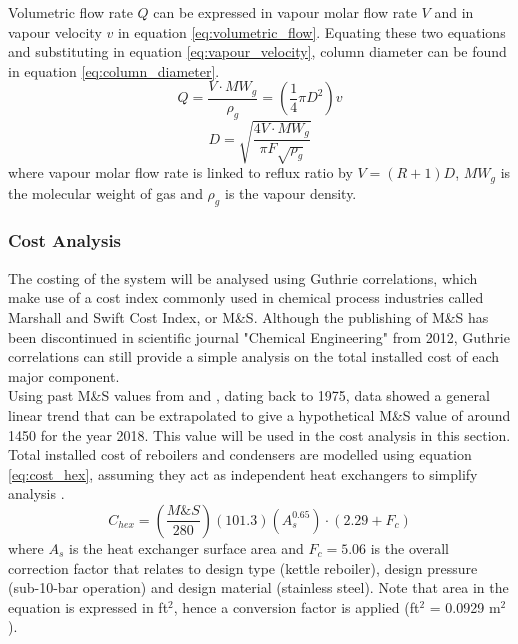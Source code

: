 		\noindent Volumetric flow rate $Q$ can be expressed in vapour molar flow rate $V$ and in vapour velocity $v$ in equation \ref{eq:volumetric_flow}. Equating these two equations and substituting in equation \ref{eq:vapour_velocity}, column diameter can be found in equation \ref{eq:column_diameter}.
		\begin{equation}
		    Q = \frac{V \cdot MW_g}{\rho_g} = \left(\frac{1}{4}\pi D^2\right)v
		    \label{eq:volumetric_flow}
		\end{equation}
		\begin{equation}
		    D = \sqrt{\frac{4V\cdot MW_g}{\pi F \sqrt{\rho_g}}}
		    \label{eq:column_diameter}
		\end{equation}
		where vapour molar flow rate is linked to reflux ratio by $V = (R+1)D$, $MW_g$ is the molecular weight of gas and $\rho_g$ is the vapour density.
	\subsubsection{Cost Analysis} \noindent
	The costing of the system will be analysed using Guthrie correlations, which make use of a cost index commonly used in chemical process industries called Marshall and Swift Cost Index, or M\&S. Although the publishing of M\&S has been discontinued in scientific journal "Chemical Engineering" from 2012, Guthrie correlations can still provide a simple analysis on the total installed cost of each major component. \\
	Using past M\&S values from \cite{peters1991} and \cite{marshall_swift}, dating back to 1975, data showed a general linear trend that can be extrapolated to give a hypothetical M\&S value of around 1450 for the year 2018. This value will be used in the cost analysis in this section. \\
	
    \noindent Total installed cost of reboilers and condensers are modelled using equation \ref{eq:cost_hex}, assuming they act as independent heat exchangers to simplify analysis \citep{douglas1988}.
    \begin{equation}
	    C_{hex} = \left(\frac{M\&S}{280}\right)\left(101.3\right)\left(A_s^{0.65}\right)\cdot (2.29 + F_c)
	    \label{eq:cost_hex}
	\end{equation}
	where $A_s$ is the heat exchanger surface area and $F_c = 5.06$ is the overall correction factor that relates to design type (kettle reboiler), design pressure (sub-10-bar operation) and design material (stainless steel). Note that area in the equation is expressed in ft$^2$, hence a conversion factor is applied (ft$^2$ = 0.0929 m$^2$). \\
	
